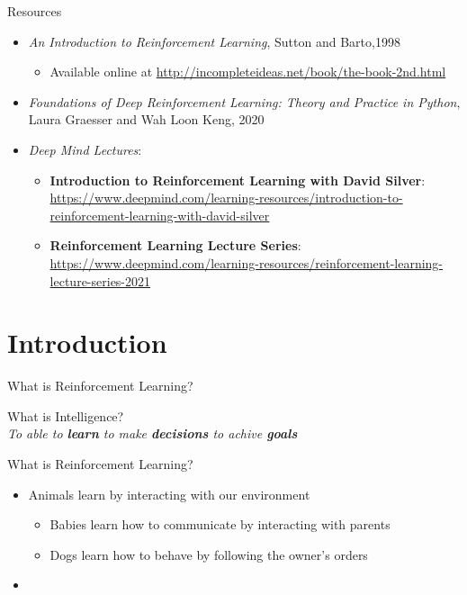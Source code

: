 \documentclass[presentation, 9pt]{beamer}\mode<presentation>{\usetheme{AMSBolognaFC}}
\begin{document}
\begin{frame}{Resources}
\begin{itemize}
	\item \emph{An Introduction to Reinforcement Learning}, Sutton and Barto,1998
	\begin{itemize}
		\item Available online at \url{http://incompleteideas.net/book/the-book-2nd.html}
	\end{itemize}
	\item \emph{Foundations of Deep Reinforcement Learning: Theory and Practice in Python}, Laura Graesser and Wah Loon Keng, 2020
	\item \emph{Deep Mind Lectures}:
	\begin{itemize}
		\item \textbf{Introduction to Reinforcement Learning with David Silver}: \url{https://www.deepmind.com/learning-resources/introduction-to-reinforcement-learning-with-david-silver}
		\item \textbf{Reinforcement Learning Lecture Series}: \url{https://www.deepmind.com/learning-resources/reinforcement-learning-lecture-series-2021}
	\end{itemize}
\end{itemize}
\end{frame}
\section{Introduction}
\begin{frame}[plain,c]
	\begin{center}
	\Huge What is Reinforcement Learning?
	\end{center}
\end{frame}

\begin{frame}[plain,c]
	\begin{center}
	\Huge What is Intelligence?
	\\
	\huge \emph{To able to \textbf{learn} to make \textbf{decisions} to achive \textbf{goals}}
	\end{center}
\end{frame}
\begin{frame}{What is Reinforcement Learning?}
\begin{itemize}
	\item Animals learn by interacting with our environment
	\begin{itemize}
		\item Babies learn how to communicate by interacting with parents
		\item Dogs learn how to behave by following the owner's orders
	\end{itemize}
	\item 
\end{itemize}
\end{frame}
\end{document}

